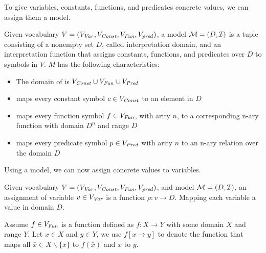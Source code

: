To give variables, constants, functions, and predicates concrete values, we can assign them a model.
\begin{mydef}[Model]
	Given vocabulary $V = (V_{\mathit{Var}}, V_{\mathit{Const}}, V_{\mathit{Fun}}, V_{\mathit{pred}})$, a model $\mathcal{M} = (D, \mathcal{I})$ is a tuple consisting of a nonempty set $D$, called interpretation domain, and an interpretation function \interpret that assigns constants, functions, and predicates over $D$ to symbols in $V$. $M$ has the following characteristics:
	\begin{itemize}
		\item The domain of \interpret is $V_{\mathit{Const}} \cup V_{\mathit{Fun}} \cup V_{\mathit{Pred}}$
		\item \interpret maps every constant symbol $c \in V_{\mathit{Const}}$ to an element in $D$
		\item \interpret maps every function symbol $f \in V_{\mathit{Fun}}$, with arity $n$, to a corresponding n-ary function with domain $D^n$ and range $D$
		\item \interpret maps every predicate symbol $p \in V_{\mathit{Pred}}$ with arity $n$ to an n-ary relation over the domain $D$
	\end{itemize}
\end{mydef}
Using a model, we can now assign concrete values to variables.
\begin{mydef}
	Given vocabulary $V = (V_{\mathit{Var}}, V_{\mathit{Const}}, V_{\mathit{Fun}}, V_{\mathit{pred}})$, and model $\mathcal{M} = (D, \mathcal{I})$, an assignment of variable $v \in V_{\mathit{Var}}$ is a function $\rho: v \rightarrow D$. Mapping each variable a value in domain $D$.
\end{mydef}
Assume $f \in V_{\mathit{Fun}}$ is a function defined as $f: X \rightarrow Y$ with some domain $X$ and range $Y$. Let $x \in X$ and $y \in Y$, we use $f[x \rightarrow y]$  to denote the function that maps all $\bar{x} \in X \backslash \{ x \}$ to $f(\bar{x})$ and $x$ to $y$.

